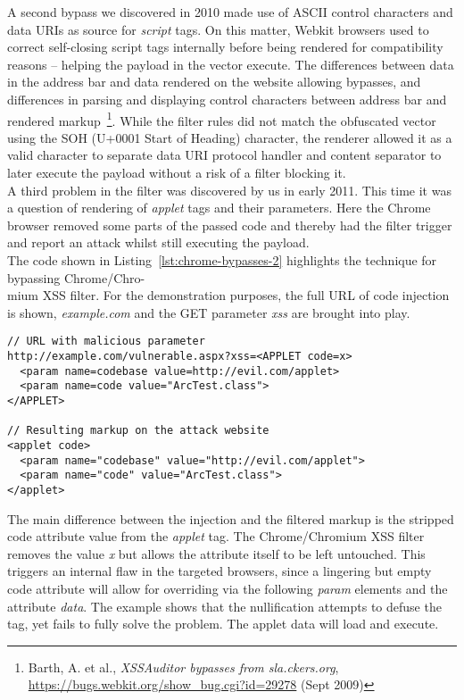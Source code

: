       A second bypass we discovered in 2010 made use of ASCII control characters and data URIs as source for \textit{script} tags. On this matter, Webkit browsers used to correct self-closing script tags internally before being rendered for compatibility reasons -- helping the payload in the vector execute. The differences between data in the address bar and data rendered on the website allowing bypasses, and differences in parsing and displaying control characters between address bar and rendered markup~\footnote{Barth, A. et al., \textit{XSSAuditor bypasses from sla.ckers.org}, \url{https://bugs.webkit.org/show_bug.cgi?id=29278} (Sept 2009)}. While the filter rules did not match the obfuscated vector using the SOH (U+0001 Start of Heading) character, the renderer allowed it as a valid character to separate data URI protocol handler and content separator to later execute the payload without a risk of a filter blocking it.\\

      A third problem in the filter was discovered by us in early 2011. This time it was a question of rendering of \textit{applet} tags and their parameters. Here the Chrome browser removed some parts of the passed code and thereby had the filter trigger and report an attack whilst still executing the payload. \\

      The code shown in Listing~\ref{lst:chrome-bypasses-2} highlights the technique for bypassing Chrome/Chro-\\
mium XSS filter. For the demonstration purposes, the full URL of code injection is shown, \textit{example.com} and the GET parameter \textit{xss} are brought into play. \\

\begin{lstlisting}[label=lst:chrome-bypasses-2,caption=Java-based example bypass for the Chrome XSS Auditor; stripping the code attribute value enables the param element to step in instead,captionpos=b]
// URL with malicious parameter 
http://example.com/vulnerable.aspx?xss=<APPLET code=x> 
  <param name=codebase value=http://evil.com/applet> 
  <param name=code value="ArcTest.class"> 
</APPLET> 

// Resulting markup on the attack website 
<applet code> 
  <param name="codebase" value="http://evil.com/applet"> 
  <param name="code" value="ArcTest.class"> 
</applet> 
\end{lstlisting} 

    The main difference between the injection and the filtered markup is the stripped code attribute value from the \textit{applet} tag. The Chrome/Chromium XSS filter removes the value \textit{x} but allows the attribute itself to be left untouched. This triggers an internal flaw in the targeted browsers, since a lingering but empty code attribute will allow for overriding via the following \textit{param} elements and the attribute \textit{data}. The example shows that the nullification attempts to defuse the tag, yet fails to fully solve the problem. The applet data will load and execute. \\

